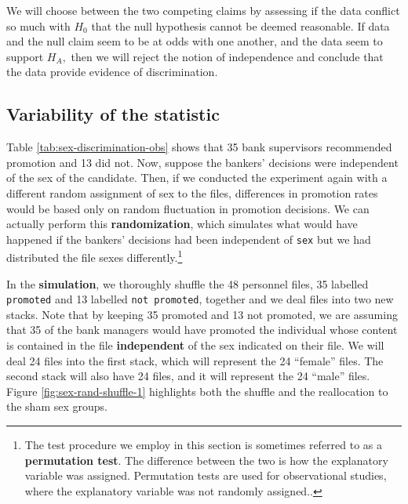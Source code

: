\documentclass[
  10pt,
  openany]{book}
\begin{document}
We will choose between the two competing claims by assessing if the data conflict so much with \(H_0\) that the null hypothesis cannot be deemed reasonable.
If data and the null claim seem to be at odds with one another, and the data seem to support \(H_A,\) then we will reject the notion of independence and conclude that the data provide evidence of discrimination.

\vspace{-2mm}

\hypertarget{variability-of-the-statistic}{%
\subsection{Variability of the statistic}\label{variability-of-the-statistic}}

Table \ref{tab:sex-discrimination-obs} shows that 35 bank supervisors recommended promotion and 13 did not.
Now, suppose the bankers' decisions were independent of the sex of the candidate.
Then, if we conducted the experiment again with a different random assignment of sex to the files, differences in promotion rates would be based only on random fluctuation in promotion decisions.
We can actually perform this \textbf{randomization}, which simulates what would have happened if the bankers' decisions had been independent of \texttt{sex} but we had distributed the file sexes differently.\footnote{The test procedure we employ in this section is sometimes referred to as a \textbf{permutation test}.
  The difference between the two is how the explanatory variable was assigned.
  Permutation tests are used for observational studies, where the explanatory variable was not randomly assigned..}

In the \textbf{simulation}, we thoroughly shuffle the 48 personnel files, 35 labelled \texttt{promoted} and 13 labelled \texttt{not\ promoted}, together and we deal files into two new stacks.
Note that by keeping 35 promoted and 13 not promoted, we are assuming that 35 of the bank managers would have promoted the individual whose content is contained in the file \textbf{independent} of the sex indicated on their file.
We will deal 24 files into the first stack, which will represent the 24 ``female'' files.
The second stack will also have 24 files, and it will represent the 24 ``male'' files.
Figure \ref{fig:sex-rand-shuffle-1} highlights both the shuffle and the reallocation to the sham sex groups.
\end{document}
